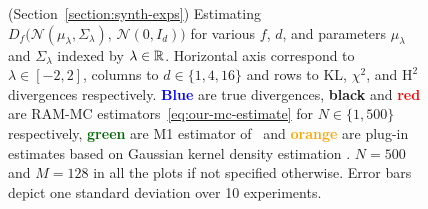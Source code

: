 \begin{figure}
\begin{center}
\end{center}
\caption{\label{fig:synthetic-exps}
(Section~\ref{section:synth-exps})
Estimating $D_f\bigl(\mathcal{N}(\mu_\lambda, \Sigma_\lambda),\, \mathcal{N}(0, I_d)\bigr)$ for various $f$, $d$, and parameters $\mu_\lambda$ and $\Sigma_\lambda$ indexed by $\lambda\in \mathbb{R}$.
Horizontal axis correspond to $\lambda\in[-2, 2]$,
columns to $d\in\{1, 4, 16\}$ and
rows to KL, $\chi^2$, and $\mathrm{H}^2$ divergences respectively.
{\bf \textcolor{blue}{Blue}} are true divergences, 
{\bf black} and {\bf \textcolor{red}{red}} are RAM-MC estimators~\eqref{eq:our-mc-estimate} for $N\in\{1, 500\}$ respectively,
{\bf \textcolor{darkgreen}{green}} are M1 estimator of~\citep{nguyen10ratio} and {\bf \textcolor{orange}{orange}} are plug-in estimates based on Gaussian kernel density estimation \citep{moon14ensemble}.
$N=500$ and $M=128$ in all the plots if not specified otherwise.
Error bars depict one standard deviation over 10 experiments.
}
\end{figure}

